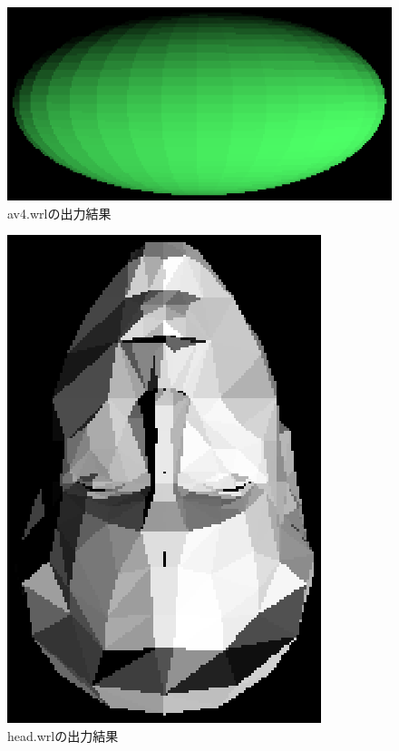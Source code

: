 \documentclass[a4j,dvipdfmx]{jsarticle}
\begin{document}
\begin{figure}[p]
  \begin{center}
        \includegraphics[clip,scale=0.5]{images/Kadai02ForAv4.eps}
        \caption{av4.wrlの出力結果}
         \label{av4}
  \end{center}
\end{figure}

\begin{figure}[p]
  \begin{center}
        \includegraphics[clip,scale=0.5]{images/Kadai02ForHead.eps}
        \caption{head.wrlの出力結果}
         \label{head}
  \end{center}
\end{figure}
\end{document}
